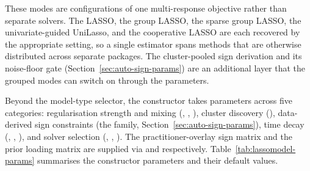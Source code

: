 \documentclass[article]{jss}
\begin{document}
These modes are configurations of one multi-response objective rather than
separate solvers. The LASSO, the group LASSO, the sparse group LASSO, the
univariate-guided UniLasso, and the cooperative LASSO are each recovered by
the appropriate setting, so a single estimator spans methods that are
otherwise distributed across separate packages. The cluster-pooled sign
derivation and its noise-floor gate (Section~\ref{sec:auto-sign-params})
are an additional layer that the grouped modes can switch on through the
 parameters.

Beyond the model-type selector, the constructor takes parameters
across five categories: regularisation strength and mixing
(, , ), cluster
discovery (), data-derived sign constraints (the
 family, Section~\ref{sec:auto-sign-params}), time
decay (, , ), and
solver selection (, , ). The
practitioner-overlay sign matrix and the prior loading matrix are
supplied via  and
 respectively. Table~\ref{tab:lassomodel-params}
summarises the constructor parameters and their default values.
\end{document}
